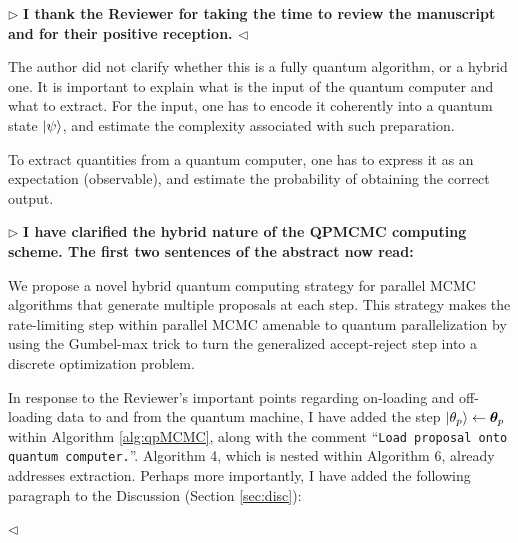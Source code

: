 \documentclass[12pt]{article}
\newenvironment{reply}{$\triangleright$\bfseries}{$\triangleleft$}
\renewenvironment{quote}
               {\list{}{\rightmargin\leftmargin}%
                \item\relax\normalfont}
               {\endlist}
\newcommand{\ttheta}{\boldsymbol{\theta}}
\begin{document}
\begin{reply}
	I thank the Reviewer for taking the time to review the manuscript and for their positive reception.
\end{reply}

The author did not clarify whether this is a fully quantum algorithm, or a hybrid one. It is important to explain what is the input of the quantum computer and what to extract. For the input, one has to encode it coherently into a quantum state $\ket{\psi}$, and estimate the complexity associated with such preparation.



To extract quantities from a quantum computer, one has to express it as an expectation (observable), and estimate the probability of obtaining the correct output. 

\begin{reply}
	I have clarified the hybrid nature of the QPMCMC computing scheme.  The first two sentences of the abstract now read:
	\begin{quote}
		We propose a novel hybrid quantum computing strategy for parallel MCMC algorithms that generate multiple proposals at each step. This strategy makes the rate-limiting step within parallel MCMC amenable to quantum parallelization by using the Gumbel-max trick to turn the generalized accept-reject step into a discrete optimization problem.
	\end{quote}

	In response to the Reviewer's important points regarding on-loading and off-loading data to and from the quantum machine, I have added the step $\ket{\theta_p} \leftarrow \ttheta_p$ within Algorithm \ref{alg:qpMCMC}, along with the comment ``\verb|Load proposal onto quantum computer.|''. Algorithm 4, which is nested within Algorithm 6, already addresses extraction.  Perhaps more importantly, I have added the following paragraph to the Discussion (Section \ref{sec:disc}):
	

\end{reply}
\end{document}
